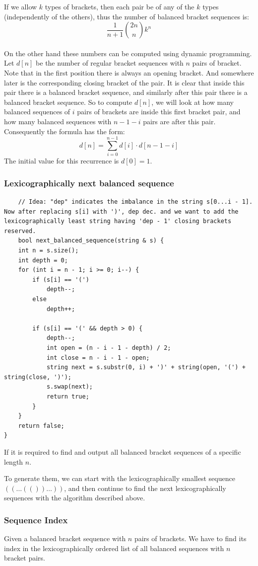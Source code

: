 \documentclass[8pt, a4paper, oneside, twocolumn]{extarticle}
\begin{document}
If we allow $k$ types of brackets, then each pair be of any of the $k$ types (independently of the others), thus the number of balanced bracket sequences is: $$\frac{1}{n+1} \binom{2n}{n} k^n$$\\
On the other hand these numbers can be computed using dynamic programming. Let $d[n]$ be the number of regular bracket sequences with $n$ pairs of bracket. Note that in the first position there is always an opening bracket. And somewhere later is the corresponding closing bracket of the pair. It is clear that inside this pair there is a balanced bracket sequence, and similarly after this pair there is a balanced bracket sequence. So to compute $d[n]$, we will look at how many balanced sequences of $i$ pairs of brackets are inside this first bracket pair, and how many balanced sequences with $n-1-i$ pairs are after this pair. Consequently the formula has the form: $$d[n] = \sum_{i=0}^{n-1} d[i] \cdot d[n-1-i]$$ The initial value for this recurrence is $d[0] = 1$.
\subsubsection{Lexicographically next balanced sequence}
\begin{verbatim}
	// Idea: "dep" indicates the imbalance in the string s[0...i - 1]. Now after replacing s[i] with ')', dep dec. and we want to add the lexicographically least string having 'dep - 1' closing brackets reserved.
	bool next_balanced_sequence(string & s) {
    int n = s.size();
    int depth = 0;
    for (int i = n - 1; i >= 0; i--) {
        if (s[i] == '(')
            depth--;
        else
            depth++;

        if (s[i] == '(' && depth > 0) {
            depth--;
            int open = (n - i - 1 - depth) / 2;
            int close = n - i - 1 - open;
            string next = s.substr(0, i) + ')' + string(open, '(') + string(close, ')');
            s.swap(next);
            return true;
        }
    }
    return false;
}
\end{verbatim}
If it is required to find and output all balanced bracket sequences of a specific length $n$.

To generate them, we can start with the lexicographically smallest sequence $((\dots(())\dots))$, and then continue to find the next lexicographically sequences with the algorithm described above. 
\subsubsection{Sequence Index}
Given a balanced bracket sequence with $n$ pairs of brackets. We have to find its index in the lexicographically ordered list of all balanced sequences with $n$ bracket pairs.
\end{document}
